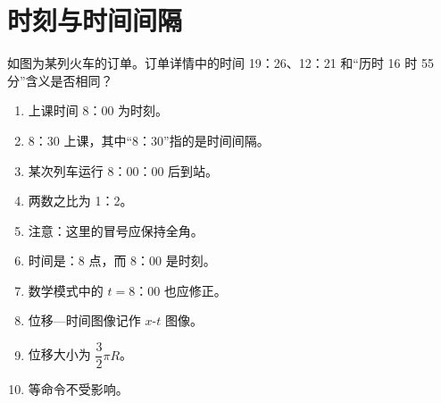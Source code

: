 \section{时刻与时间间隔}

如图为某列火车的订单。订单详情中的时间 19：26、12：21 和“历时 16 时 55 分”含义是否相同？

\begin{enumerate}
  \item 上课时间 8：00 为时刻。
  \item 8：30 上课，其中“8：30”指的是时间间隔。
  \item 某次列车运行 8：00：00 后到站。
  \item 两数之比为 1：2。
  \item 注意：这里的冒号应保持全角。
  \item 时间是：8 点，而 8：00 是时刻。
  \item 数学模式中的 $t=8：00$ 也应修正。
  \item 位移—时间图像记作 $x$-$t$ 图像。
  \item 位移大小为 $\dfrac{3}{2}\pi R$。
  \item {} 等命令不受影响。
\end{enumerate}
